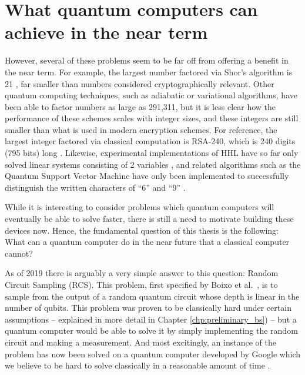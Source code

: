 \section{What quantum computers can achieve in the near term}
\label{sec:near-term-power}

However, several of these problems seem to be far off from offering a benefit in the near term. For example, the largest number factored via Shor's algorithm is 21 \cite{martinlopez2012}, far smaller than numbers considered cryptographically relevant. Other quantum computing techniques, such as adiabatic \cite{xu2012, dattani2014, dridi2017, li2017} or variational \cite{anschuetz2018} algorithms, have been able to factor numbers as large as 291,311, but it is less clear how the performance of these schemes scales with integer sizes, and these integers are still smaller than what is used in modern encryption schemes. For reference, the largest integer factored via classical computation is RSA-240, which is 240 digits (795 bits) long \cite{boudot2019}. Likewise, experimental implementations of HHL have so far only solved linear systems consisting of 2 variables \cite{cai2013, pan2014, barz2014}, and related algorithms such as the Quantum Support Vector Machine have only been implemented to successfully distinguish the written characters of ``6'' and ``9'' \cite{li2015}.

While it is interesting to consider problems which quantum computers will eventually be able to solve faster, there is still a need to motivate building these devices now. Hence, the fundamental question of this thesis is the following: What can a quantum computer do in the near future that a classical computer cannot?

As of 2019 there is arguably a very simple answer to this question: Random Circuit Sampling (RCS). This problem, first specified by Boixo et al.~\cite{boixo2018}, is to sample from the output of a random quantum circuit whose depth is linear in the number of qubits. This problem was proven to be classically hard under certain assumptions \cite{hangleiter2018, bouland2018} -- explained in more detail in Chapter \ref{chp:preliminary_bs}) -- but a quantum computer would be able to solve it by simply implementing the random circuit and making a measurement. And most excitingly, an instance of the problem has now been solved on a quantum computer developed by Google which we believe to be hard to solve classically in a reasonable amount of time \cite{arute2019}.

